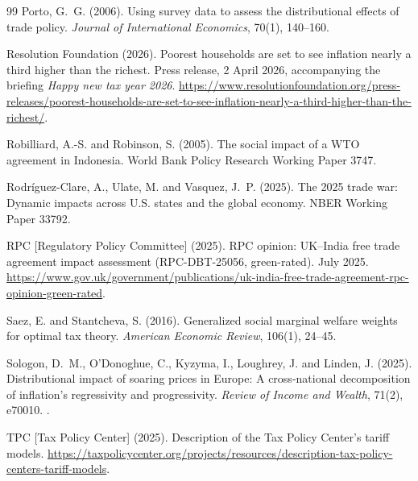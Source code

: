 \begin{thebibliography}{99}
Porto, G.~G. (2006).
\newblock Using survey data to assess the distributional effects of trade policy.
\newblock \emph{Journal of International Economics}, 70(1), 140--160.

Resolution Foundation (2026).
\newblock Poorest households are set to see inflation nearly a third higher than the richest.
\newblock Press release, 2 April 2026, accompanying the briefing \emph{Happy new tax year 2026}. \url{https://www.resolutionfoundation.org/press-releases/poorest-households-are-set-to-see-inflation-nearly-a-third-higher-than-the-richest/}.

Robilliard, A.-S. and Robinson, S. (2005).
\newblock The social impact of a WTO agreement in Indonesia.
\newblock World Bank Policy Research Working Paper 3747.

Rodr\'{i}guez-Clare, A., Ulate, M. and Vasquez, J.~P. (2025).
\newblock The 2025 trade war: Dynamic impacts across U.S. states and the global economy.
\newblock NBER Working Paper 33792.

RPC [Regulatory Policy Committee] (2025).
\newblock RPC opinion: UK--India free trade agreement impact assessment (RPC-DBT-25056, green-rated).
 July 2025. \url{https://www.gov.uk/government/publications/uk-india-free-trade-agreement-rpc-opinion-green-rated}.

Saez, E. and Stantcheva, S. (2016).
\newblock Generalized social marginal welfare weights for optimal tax theory.
\newblock \emph{American Economic Review}, 106(1), 24--45.

Sologon, D.~M., O'Donoghue, C., Kyzyma, I., Loughrey, J. and Linden, J. (2025).
\newblock Distributional impact of soaring prices in Europe: A cross-national decomposition of inflation's regressivity and progressivity.
\newblock \emph{Review of Income and Wealth}, 71(2), e70010. .

TPC [Tax Policy Center] (2025).
\newblock Description of the Tax Policy Center's tariff models.
\newblock \url{https://taxpolicycenter.org/projects/resources/description-tax-policy-centers-tariff-models}.

\end{thebibliography}
\endgroup
